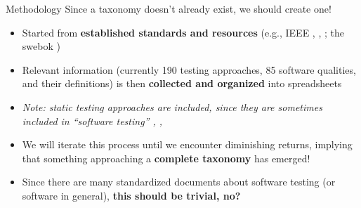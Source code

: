 \documentclass[22pt]{beamer}
\begin{document}
\begin{frame}[fragile]
\begin{textblock}{7.25}
        \begin{block}{\fontsize{37}{20}\selectfont Methodology}
            Since a taxonomy doesn't already exist, we should create one!
            \begin{itemize}
                \item Started from \textbf{established standards and resources}
                      (e.g., IEEE \cite{IEEE2022}, \cite{IEEE2017}, \cite{IEEE2013};
                      the \acf{swebok} \cite{SWEBOK2024})
                \item Relevant information (currently 190 testing approaches,
                      85 software qualities, and their definitions) is then
                      \textbf{collected and organized} into spreadsheets
                \item \emph{Note: static testing approaches are included, since
                          they are sometimes included in ``software testing''
                          \cite[p.~17]{IEEE2022}, \cite[p.~440]{IEEE2017},
                          \cite[p.~5-2]{SWEBOK2024}}
                \item We will iterate this process until we encounter
                      diminishing returns, implying that something approaching
                      a \textbf{complete taxonomy} has emerged!
                \item Since there are many standardized documents about
                      software testing (or software in general),
                      \textbf{this should be trivial, no?}
            \end{itemize}
            \vspace{5mm}
        \end{block}


\end{textblock}
\end{frame}
\end{document}
